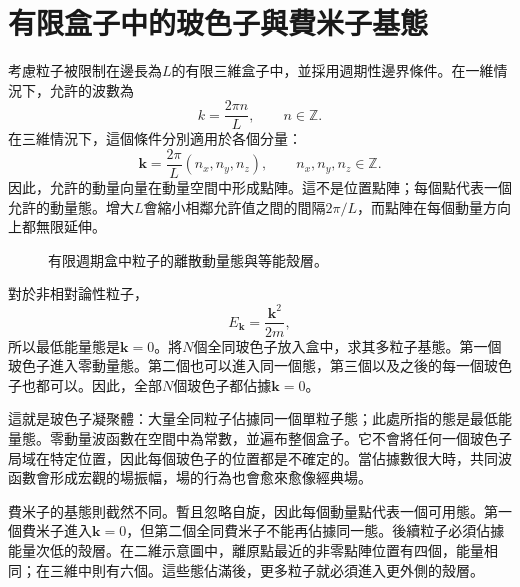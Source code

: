 \section{有限盒子中的玻色子與費米子基態}

考慮粒子被限制在邊長為\(L\)的有限三維盒子中，並採用週期性邊界條件。在一維情況下，允許的波數為
\begin{equation}
k=\frac{2\pi n}{L},
\qquad n\in\mathbb{Z}.
\end{equation}
在三維情況下，這個條件分別適用於各個分量：
\begin{equation}
\mathbf{k}=\frac{2\pi}{L}(n_x,n_y,n_z),
\qquad n_x,n_y,n_z\in\mathbb{Z}.
\end{equation}
因此，允許的動量向量在動量空間中形成點陣。這不是位置點陣；每個點代表一個允許的動量態。增大\(L\)會縮小相鄰允許值之間的間隔\(2\pi/L\)，而點陣在每個動量方向上都無限延伸。

\begin{figure}
\centering
{}
\caption{有限週期盒中粒子的離散動量態與等能殼層。}
\end{figure}

對於非相對論性粒子，
\begin{equation}
E_{\mathbf{k}}=\frac{\mathbf{k}^2}{2m},
\end{equation}
所以最低能量態是\(\mathbf{k}=0\)。將\(N\)個全同玻色子放入盒中，求其多粒子基態。第一個玻色子進入零動量態。第二個也可以進入同一個態，第三個以及之後的每一個玻色子也都可以。因此，全部\(N\)個玻色子都佔據\(\mathbf{k}=0\)。

這就是玻色子凝聚體：大量全同粒子佔據同一個單粒子態；此處所指的態是最低能量態。零動量波函數在空間中為常數，並遍布整個盒子。它不會將任何一個玻色子局域在特定位置，因此每個玻色子的位置都是不確定的。當佔據數很大時，共同波函數會形成宏觀的場振幅，場的行為也會愈來愈像經典場。

費米子的基態則截然不同。暫且忽略自旋，因此每個動量點代表一個可用態。第一個費米子進入\(\mathbf{k}=0\)，但第二個全同費米子不能再佔據同一態。後續粒子必須佔據能量次低的殼層。在二維示意圖中，離原點最近的非零點陣位置有四個，能量相同；在三維中則有六個。這些態佔滿後，更多粒子就必須進入更外側的殼層。

